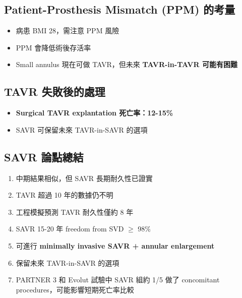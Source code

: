 \documentclass[12pt,a4paper]{article}
\begin{document}
\subsection{Patient-Prosthesis Mismatch (PPM) 的考量}

\begin{itemize}[leftmargin=*]
    \item 病患 BMI 28，需注意 PPM 風險
    \item PPM 會降低術後存活率
    \item Small annulus 現在可做 TAVR，但未來 \textbf{TAVR-in-TAVR 可能有困難}
\end{itemize}

\subsection{TAVR 失敗後的處理}

\begin{itemize}[leftmargin=*]
    \item \textbf{Surgical TAVR explantation 死亡率：12-15\%}
    \item SAVR 可保留未來 TAVR-in-SAVR 的選項
\end{itemize}

\subsection{SAVR 論點總結}

\begin{tcolorbox}[colback=blue!5!white, colframe=blue!50!black, title=\textbf{支持 SAVR 的理由}]
\begin{enumerate}[leftmargin=*]
    \item 中期結果相似，但 SAVR 長期耐久性已證實
    \item TAVR 超過 10 年的數據仍不明
    \item 工程模擬預測 TAVR 耐久性僅約 8 年
    \item SAVR 15-20 年 freedom from SVD $\geq$ 98\%
    \item 可進行 \textbf{minimally invasive SAVR + annular enlargement}
    \item 保留未來 TAVR-in-SAVR 的選項
    \item PARTNER 3 和 Evolut 試驗中 SAVR 組約 1/5 做了 concomitant procedures，可能影響短期死亡率比較
\end{enumerate}
\end{tcolorbox}

\end{document}
